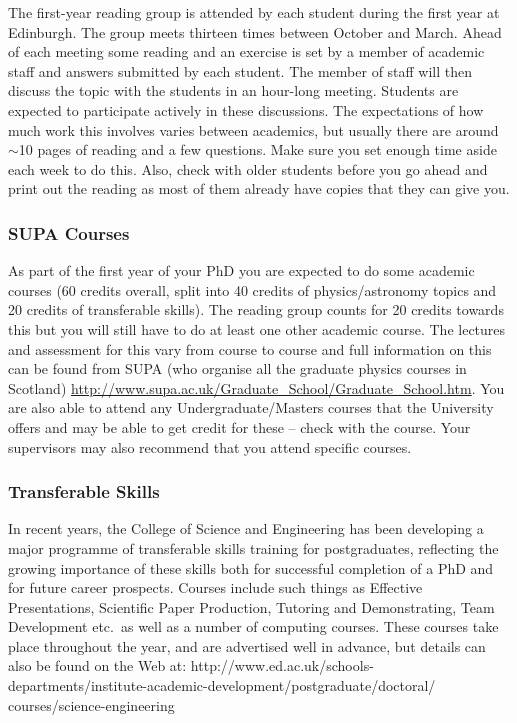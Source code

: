 The first-year reading group is attended by each student during the first year at Edinburgh.  The group meets thirteen times between October and March.  Ahead of each meeting some reading and an exercise is set by a member of academic staff and answers submitted by each student.  The member of staff will then discuss the topic with the students in an hour-long meeting.  Students are expected to participate actively in these discussions. The expectations of how much work this involves varies between academics, but usually there are around \(\sim\)10 pages of reading and a few questions. Make sure you set enough time aside each week to do this. Also, check with older students before you go ahead and print out the reading as most of them already have copies that they can give you.

\subsubsection{SUPA Courses}

As part of the first year of your PhD you are expected to do some academic courses (60 credits overall, split into 40 credits of physics/astronomy topics and 20 credits of transferable skills). The
reading group counts for 20 credits towards this but you will still have to do at least one other
academic course. The lectures and assessment for this vary from course to course and full
information on this can be found from SUPA (who organise all the graduate physics courses in Scotland)
\url{http://www.supa.ac.uk/Graduate_School/Graduate_School.htm}.
You are also able to attend any Undergraduate/Masters courses that the University offers
and may be able to get credit for these -- check with the course.
Your supervisors may also recommend that you attend specific courses. 

\subsubsection{Transferable Skills}

In recent years, the College of Science and Engineering
has been developing a major programme of transferable skills training
for postgraduates, reflecting the growing importance of these skills both
for successful completion of a PhD and for future career prospects.
Courses include such things as Effective Presentations, Scientific Paper
Production, Tutoring and Demonstrating, Team Development etc.\ as well as a
 number of computing courses. These courses take place throughout the year, 
and are advertised well in advance, but details can also be found on the
Web at: http://www.ed.ac.uk/schools-departments/institute-academic-development/postgraduate/doctoral/\\ courses/science-engineering

